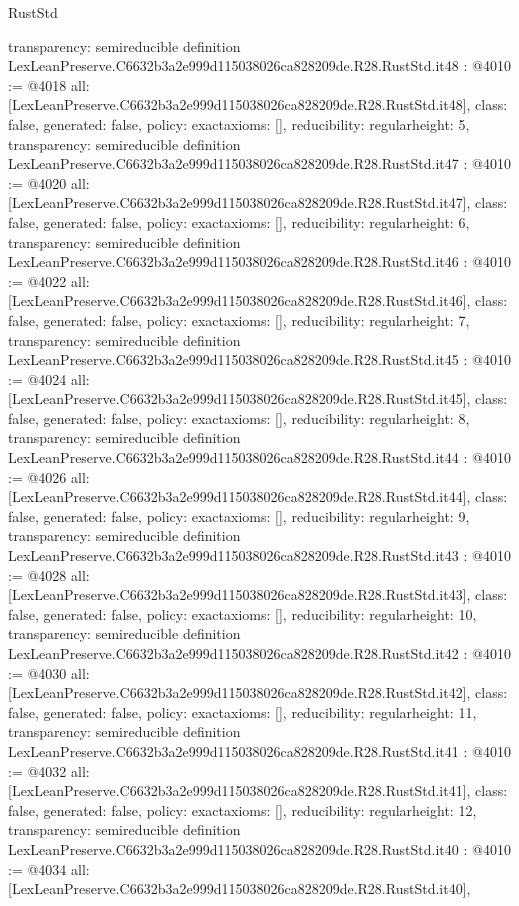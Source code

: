 \begin{lexlean}{RustStd}
\begin{coremodule}
{  transparency: semireducible
}
definition LexLeanPreserve.C6632b3a2e999d115038026ca828209de.R28.RustStd.it48 : @4010 := @4018 {
  all: [LexLeanPreserve.C6632b3a2e999d115038026ca828209de.R28.RustStd.it48],
  class: false,
  generated: false,
  policy: exact{axioms: []},
  reducibility: regular{height: 5},
  transparency: semireducible
}
definition LexLeanPreserve.C6632b3a2e999d115038026ca828209de.R28.RustStd.it47 : @4010 := @4020 {
  all: [LexLeanPreserve.C6632b3a2e999d115038026ca828209de.R28.RustStd.it47],
  class: false,
  generated: false,
  policy: exact{axioms: []},
  reducibility: regular{height: 6},
  transparency: semireducible
}
definition LexLeanPreserve.C6632b3a2e999d115038026ca828209de.R28.RustStd.it46 : @4010 := @4022 {
  all: [LexLeanPreserve.C6632b3a2e999d115038026ca828209de.R28.RustStd.it46],
  class: false,
  generated: false,
  policy: exact{axioms: []},
  reducibility: regular{height: 7},
  transparency: semireducible
}
definition LexLeanPreserve.C6632b3a2e999d115038026ca828209de.R28.RustStd.it45 : @4010 := @4024 {
  all: [LexLeanPreserve.C6632b3a2e999d115038026ca828209de.R28.RustStd.it45],
  class: false,
  generated: false,
  policy: exact{axioms: []},
  reducibility: regular{height: 8},
  transparency: semireducible
}
definition LexLeanPreserve.C6632b3a2e999d115038026ca828209de.R28.RustStd.it44 : @4010 := @4026 {
  all: [LexLeanPreserve.C6632b3a2e999d115038026ca828209de.R28.RustStd.it44],
  class: false,
  generated: false,
  policy: exact{axioms: []},
  reducibility: regular{height: 9},
  transparency: semireducible
}
definition LexLeanPreserve.C6632b3a2e999d115038026ca828209de.R28.RustStd.it43 : @4010 := @4028 {
  all: [LexLeanPreserve.C6632b3a2e999d115038026ca828209de.R28.RustStd.it43],
  class: false,
  generated: false,
  policy: exact{axioms: []},
  reducibility: regular{height: 10},
  transparency: semireducible
}
definition LexLeanPreserve.C6632b3a2e999d115038026ca828209de.R28.RustStd.it42 : @4010 := @4030 {
  all: [LexLeanPreserve.C6632b3a2e999d115038026ca828209de.R28.RustStd.it42],
  class: false,
  generated: false,
  policy: exact{axioms: []},
  reducibility: regular{height: 11},
  transparency: semireducible
}
definition LexLeanPreserve.C6632b3a2e999d115038026ca828209de.R28.RustStd.it41 : @4010 := @4032 {
  all: [LexLeanPreserve.C6632b3a2e999d115038026ca828209de.R28.RustStd.it41],
  class: false,
  generated: false,
  policy: exact{axioms: []},
  reducibility: regular{height: 12},
  transparency: semireducible
}
definition LexLeanPreserve.C6632b3a2e999d115038026ca828209de.R28.RustStd.it40 : @4010 := @4034 {
  all: [LexLeanPreserve.C6632b3a2e999d115038026ca828209de.R28.RustStd.it40],
}
\end{coremodule}
\end{lexlean}
